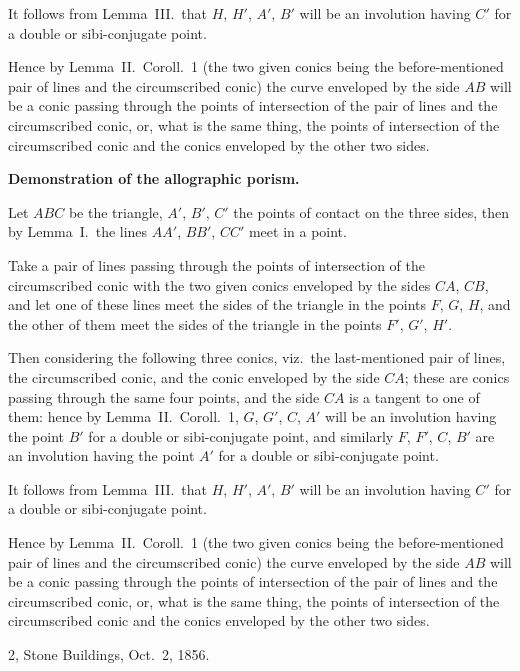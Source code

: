\documentclass[11pt,a4paper]{book}
\begin{document}
It follows from Lemma~III.\ that $H$, $H'$, $A'$, $B'$ will be an involution having $C'$ for a double or sibi-conjugate point.

Hence by Lemma~II.\ Coroll.~1 (the two given conics being the before-mentioned pair of lines and the circumscribed conic) the curve enveloped by the side $AB$ will be a conic passing through the points of intersection of the pair of lines and the circumscribed conic, or, what is the same thing, the points of intersection of the circumscribed conic and the conics enveloped by the other two sides.

\textbf{Demonstration of the allographic porism.}

Let $ABC$ be the triangle, $A'$, $B'$, $C'$ the points of contact on the three sides, then by Lemma~I.\ the lines $AA'$, $BB'$, $CC'$ meet in a point.

Take a pair of lines passing through the points of intersection of the circumscribed conic with the two given conics enveloped by the sides $CA$, $CB$, and let one of these lines meet the sides of the triangle in the points $F$, $G$, $H$, and the other of them meet the sides of the triangle in the points $F'$, $G'$, $H'$.

Then considering the following three conics, viz.\ the last-mentioned pair of lines, the circumscribed conic, and the conic enveloped by the side $CA$; these are conics passing through the same four points, and the side $CA$ is a tangent to one of them: hence by Lemma~II.\ Coroll.~1, $G$, $G'$, $C$, $A'$ will be an involution having the point $B'$ for a double or sibi-conjugate point, and similarly $F$, $F'$, $C$, $B'$ are an involution having the point $A'$ for a double or sibi-conjugate point.

It follows from Lemma~III.\ that $H$, $H'$, $A'$, $B'$ will be an involution having $C'$ for a double or sibi-conjugate point.

Hence by Lemma~II.\ Coroll.~1 (the two given conics being the before-mentioned pair of lines and the circumscribed conic) the curve enveloped by the side $AB$ will be a conic passing through the points of intersection of the pair of lines and the circumscribed conic, or, what is the same thing, the points of intersection of the circumscribed conic and the conics enveloped by the other two sides.

\begin{flushright}
2, Stone Buildings, Oct.~2, 1856.
\end{flushright}


\newpage
\end{document}
